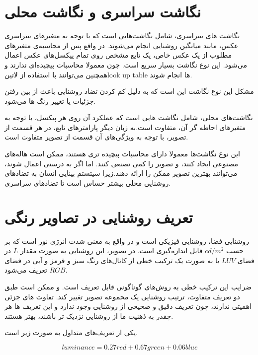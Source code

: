  \section{  نگاشت سراسری و نگاشت محلی}
 
نگاشت های سراسری، شامل نگاشت‌هایی است که با توجه به متغیرهای سراسری عکس، مانند میانگین روشنایی انجام می‌شوند. در واقع پس از محاسبه‌ی متغیرهای مطلوب از یک عکس خاص، یک تابع مشخص روی تمام پیکسل‌های عکس اعمال می‌شود. این نوع نگاشت بسیار سریع است. چون معمولا محاسبات پیچیده‌ای ندارند و همچنین می‌توانند با استفاده از
 ‌لاتین{look up table  }
ها انجام شوند.

مشکل این نوع نگاشت این است که به دلیل کم کردن تضاد روشنایی باعث از بین رفتن جزئیات یا تغییر رنگ ها می‌شود.

نگاشت‌های محلی، شامل نگاشت هایی است که عملکرد آن روی هر پیکسل، با توجه به متغیرهای احاطه گر آن، متفاوت است.به زبان دیگر پارامترهای تابع، در هر قسمت از تصویر، با توجه به ویژگی‌های آن قسمت از تصویر متفاوت است.

این نوع نگاشت‌ها معمولا دارای محاسبات پیچیده تری هستند، ممکن است هاله‌های مصنوعی ایجاد کنند، و تصویر را کمی تصنعی کنند. اما اگر به درستی اعمال شوند، می‌توانند بهترین تصویر ممکن را ارائه دهند.زیرا سیتستم بینایی انسان به تضادهای روشنایی محلی بیشتر حساس است تا تضادهای سراسری.


\section{تعریف روشنایی در تصاویر رنگی}

روشنایی فضا، روشنایی فیزیکی است و در واقع به معنی شدت انرژی نور است که بر حسب $cd/m^{2}$ قابل اندازه‌گیری است. در تصویر، این روشنایی به صورت مقدار $L$ در فضای  $LUV$ یا به صورت یک ترکیب خطی از کانال‌های رنگ سبز و قرمز و آبی در فضای $RGB$ تعریف می‌شود.

ضرایب این ترکیب خطی به روش‌های گوناگونی قابل تعریف است.  و ممکن است طبق دو تعریف متفاوت، ترتیب روشنایی یک محموعه  تصویر تغییر کند. تفاوت های جزئی  اهمیتی ندارند، چون تعریف دقیق و صحیحی از روشنایی وجود ندارد و این تعریف ها هر چقدر به ذهنیت ما از روشنایی نزدیک تر باشند، بهتر  هستند.

یکی از تعریف‌های متداول به صورت زیر است.

\begin{equation}
luminance = 0.27 red + 0.67 green + 0.06 blue
\end{equation}
